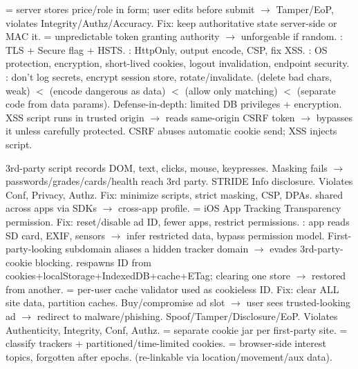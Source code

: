  = server stores price/role in form; user edits before submit $\to$ Tamper/EoP, violates Integrity/Authz/Accuracy. Fix: keep authoritative state server-side or MAC it.  = unpredictable token granting authority $\to$ unforgeable if random.
: TLS + Secure flag + HSTS. : HttpOnly, output encode, CSP, fix XSS. : OS protection, encryption, short-lived cookies, logout invalidation, endpoint security. : don't log secrets, encrypt session store, rotate/invalidate.
 (delete bad chars, weak) $<$  (encode dangerous as data) $<$  (allow only matching) $<$  (separate code from data params). Defense-in-depth: limited DB privileges + encryption.
XSS script runs in trusted origin $\to$ reads same-origin CSRF token $\to$ bypasses it unless carefully protected. CSRF abuses automatic cookie send; XSS injects script.

3rd-party script records DOM, text, clicks, mouse, keypresses. Masking fails $\to$ passwords/grades/cards/health reach 3rd party. STRIDE Info disclosure. Violates Conf, Privacy, Authz. Fix: minimize scripts, strict masking, CSP, DPAs.
 shared across apps via SDKs $\to$ cross-app profile.  = iOS App Tracking Transparency permission. Fix: reset/disable ad ID, fewer apps, restrict permissions. : app reads SD card, EXIF, sensors $\to$ infer restricted data, bypass permission model.
First-party-looking subdomain aliases a hidden tracker domain $\to$ evades 3rd-party-cookie blocking.
 respawns ID from cookies+localStorage+IndexedDB+cache+ETag; clearing one store $\to$ restored from another.  = per-user cache validator used as cookieless ID. Fix: clear ALL site data, partition caches.
Buy/compromise ad slot $\to$ user sees trusted-looking ad $\to$ redirect to malware/phishing. Spoof/Tamper/Disclosure/EoP. Violates Authenticity, Integrity, Conf, Authz.
 = separate cookie jar per first-party site.  = classify trackers + partitioned/time-limited cookies.  = browser-side interest topics, forgotten after epochs.  (re-linkable via location/movement/aux data). 

